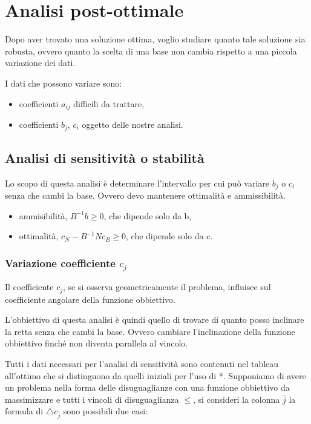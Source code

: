 \section{Analisi post-ottimale}
Dopo aver trovato una soluzione ottima, voglio studiare quanto tale soluzione sia robusta, ovvero quanto la scelta di una base non cambia rispetto a una piccola variazione dei dati.

I dati che possono variare sono:

\begin{itemize}
	\item coefficienti $a_{ij}$ difficili da trattare,
	\item coefficienti $b_j$, $c_i$ oggetto delle nostre analisi.
\end{itemize}

\subsection{Analisi di sensitività o stabilità}
Lo scopo di questa analisi è determinare l'intervallo per cui può variare $b_j$ o $c_i$ senza che cambi la base. Ovvero devo mantenere ottimalità e ammissibilità.

\begin{itemize}
	\item ammisibilità, $B^{-1}b \geq 0$, che dipende solo da b,
	\item ottimalità, $c_N - B^{-1}Nc_B \geq 0$, che dipende solo da c.
\end{itemize}

\subsubsection{Variazione coefficiente $c_j$}
Il coefficiente $c_j$, se si osserva geometricamente il problema, influisce sul coefficiente angolare della funzione obbiettivo. 

L'obbiettivo di questa analisi è quindi quello di trovare di quanto posso inclinare la retta senza che cambi la base. Ovvero cambiare l'inclinazione della funzione obbiettivo finché non diventa parallela al vincolo.


Tutti i dati necessari per l'analisi di sensitività sono contenuti nel tableau all'ottimo che si distinguono da quelli iniziali per l'uso di *.
Supponiamo di avere un problema nella forma delle disuguaglianze con una funzione obbiettivo da massimizzare e tutti i vincoli di disuguaglianza $\leq$, si consideri la colonna $\bar{j}$ la formula di $\triangle c_{\bar{j}}$ sono possibili due casi: 

